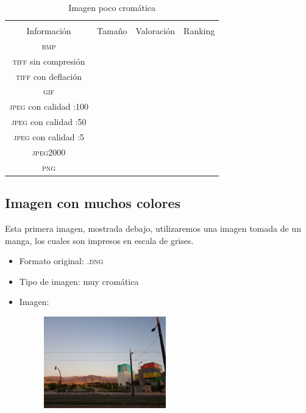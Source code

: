 \documentclass[11pt,a4paper]{article}
\begin{document}
\begin{table}[H]
\centering
\begin{tabular}{|c|c|c|c|}
\hline
\diagbox[width=15em]{\textit{Códec}/Formato}{\\Información} & Tamaño & Valoración & Ranking \\
\hline
\textsc{bmp} &  &  &  \\ \hline
\textsc{tiff} sin compresión &  &  &  \\ \hline
\textsc{tiff} con deflación &  &  &  \\ \hline
\textsc{gif} &  &  &  \\ \hline
\textsc{jpeg} con calidad :100 &  &  &  \\ \hline
\textsc{jpeg} con calidad :50 &  &  &  \\ \hline
\textsc{jpeg} con calidad :5 &  &  &  \\ \hline
\textsc{jpeg2000} &  &  &  \\ \hline
\textsc{png} &  &  &  \\ \hline
\end{tabular}
\caption{Imagen poco cromática}
\label{tab:my-table}
\end{table}


\subsection{Imagen con muchos colores}

Esta primera imagen, mostrada debajo, utilizaremos una imagen tomada de un manga, los cuales son impresos en escala de grises.

\begin{itemize}
	\item Formato original: \textsc{.dng}
	\item Tipo de imagen: muy cromática
	\item Imagen:
		\begin{figure}[H]
		\centering
			\includegraphics[width=0.5\textwidth]{Fotos/crom.jpg}
		\end{figure}	
\end{itemize}
\end{document}
